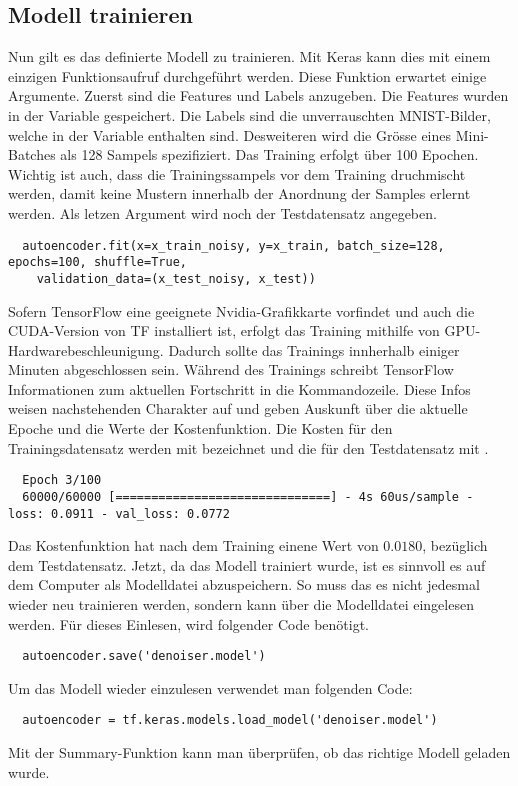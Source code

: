 \subsection{Modell trainieren}
Nun gilt es das definierte Modell zu trainieren.
Mit Keras kann dies mit einem einzigen Funktionsaufruf durchgeführt werden.
Diese Funktion erwartet einige Argumente. Zuerst sind die Features und Labels anzugeben. Die
Features wurden in der Variable  gespeichert. Die Labels
sind die unverrauschten MNIST-Bilder, welche in der Variable  enthalten sind.
Desweiteren wird die Grösse eines Mini-Batches als 128 Sampels spezifiziert. Das
Training erfolgt über 100 Epochen.
Wichtig ist auch, dass die Trainingssampels vor dem Training druchmischt werden, damit keine Mustern
innerhalb der Anordnung der Samples erlernt werden. Als letzen Argument wird noch
der Testdatensatz angegeben.
\begin{verbatim}
  autoencoder.fit(x=x_train_noisy, y=x_train, batch_size=128, epochs=100, shuffle=True,
    validation_data=(x_test_noisy, x_test))
\end{verbatim}
Sofern TensorFlow eine geeignete Nvidia-Grafikkarte vorfindet und auch die
CUDA-Version von TF installiert ist, erfolgt das Training mithilfe von GPU-Hardwarebeschleunigung.
Dadurch sollte das Trainings innherhalb einiger Minuten abgeschlossen sein.
Während des Trainings schreibt TensorFlow Informationen zum aktuellen Fortschritt in die
Kommandozeile. Diese Infos weisen nachstehenden Charakter auf und geben Auskunft über die aktuelle Epoche und die
Werte der Kostenfunktion. Die Kosten für den Trainingsdatensatz werden mit
 bezeichnet und die für den Testdatensatz mit .
\begin{verbatim}
  Epoch 3/100
  60000/60000 [==============================] - 4s 60us/sample - loss: 0.0911 - val_loss: 0.0772
\end{verbatim}
Das Kostenfunktion hat nach dem Training einene Wert  von $0.0180$,
bezüglich dem Testdatensatz.
\para{}
Jetzt, da das Modell trainiert wurde, ist es sinnvoll es auf dem Computer als
Modelldatei abzuspeichern.
So muss das es nicht jedesmal wieder neu trainieren werden, sondern kann über
die Modelldatei eingelesen werden. Für dieses Einlesen, wird folgender Code benötigt.
\begin{verbatim}
  autoencoder.save('denoiser.model')
\end{verbatim}
Um das Modell wieder einzulesen verwendet man folgenden Code:
\begin{verbatim}
  autoencoder = tf.keras.models.load_model('denoiser.model')
\end{verbatim}
Mit der Summary-Funktion kann man überprüfen, ob das richtige Modell geladen wurde.


